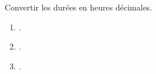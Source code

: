 \begin{exercice*}
   Convertir les durées en heures décimales.
   \begin{multicols}{3}
      \begin{enumerate}
         \item {}.
         \item {}.
         \item {}.
      \end{enumerate}
   \end{multicols}
\end{exercice*}